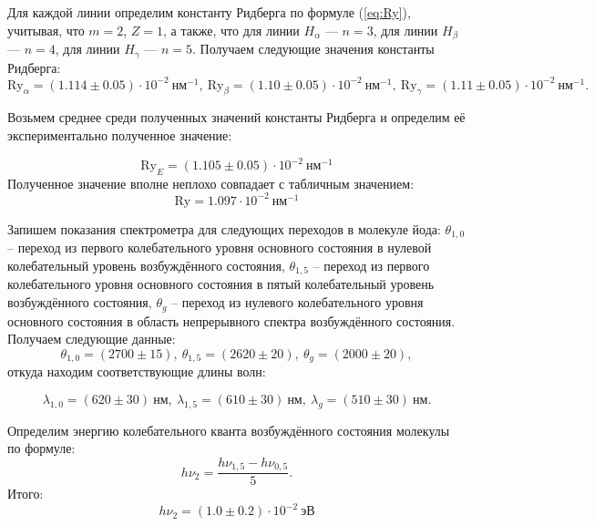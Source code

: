 		
		Для каждой линии определим константу Ридберга по формуле (\ref{eq:Ry}), учитывая, что $m=2$, $Z=1$, а также, что для линии $H_{\alpha}$ --- $n=3$, для линии $H_{\beta}$ --- $n=4$, для линии $H_{\gamma}$ --- $n=5$. Получаем следующие значения константы Ридберга:
		\begin{equation*}
			\text{Ry}_{\alpha}=(1.114\pm 0.05) \cdot 10^{-2} \ \text{нм}^{-1}, \ \text{Ry}_{\beta} =(1.10\pm 0.05)\cdot 10^{-2} \ \text{нм}^{-1}, \ \text{Ry}_{\gamma}=(1.11\pm 0.05)\cdot 10^{-2}\ \text{нм}^{-1}.
		\end{equation*}
	
		Возьмем среднее среди полученных значений константы Ридберга и определим её экспериментально полученное значение:
		
		\[ \text{Ry}_E=(1.105\pm 0.05)\cdot 10^{-2} ~\text{нм}^{-1} \]
		Полученное значение вполне неплохо совпадает с табличным значением: 
		\[ \text{Ry}=1.097\cdot 10^{-2} \ \text{нм}^{-1} \]
		
		Запишем показания спектрометра для следующих переходов в молекуле йода: $\theta_{1,0}$ -- переход из первого колебательного уровня основного состояния в нулевой колебательный уровень возбуждённого состояния,  $\theta_{1,5}$ -- переход из первого колебательного уровня основного состояния в пятый колебательный уровень возбуждённого состояния, $\theta_{g}$ -- переход из нулевого колебательного уровня основного состояния в область непрерывного спектра возбуждённого состояния. Получаем следующие данные:
		\begin{equation*}
			\theta_{1,0}=(2700\pm 15), \ \theta_{1,5}=(2620\pm 20), \ \theta_g=(2000\pm 20),
		\end{equation*}
		 откуда находим соответствующие длины волн: 
		 
		 \begin{equation*}
		 	\lambda_{1,0}=(620\pm 30) \ \text{нм}, \ \lambda_{1,5}=(610\pm 30) \ \text{нм}, \ \lambda_g=(510\pm 30)\ \text{нм}.
		 \end{equation*}
		
		Определим энергию колебательного кванта возбуждённого состояния молекулы по формуле: 
		\begin{equation*}
			h \nu_2=\dfrac{h\nu_{1,5}-h \nu_{0,5}}{5}.
		\end{equation*}
		Итого:
		\begin{equation*}
			h\nu_2=(1.0\pm 0.2)\cdot 10^{-2} \ \text{эВ}
		\end{equation*}
			
